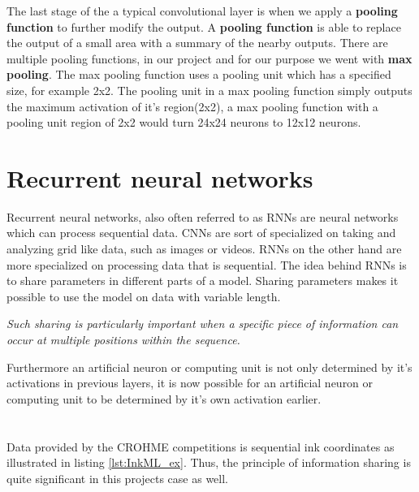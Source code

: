 The last stage of the a typical convolutional layer is when we apply a \textbf{pooling function}\parencite{zhou_computation_1988} to further modify the output. A \textbf{pooling function} is able to replace the output of a small area with a summary of the nearby outputs. There are multiple pooling functions, in our project and for our purpose we went with \textbf{max pooling}. The max pooling function uses a pooling unit which has a specified size, for example 2x2. The pooling unit in a max pooling function simply outputs the maximum activation of it's region(2x2), a max pooling function with a pooling unit region of 2x2 would turn 24x24 neurons to 12x12 neurons. \cite{goodfellow_deep_2016} \cite{nielsen_neural_2015}

\section{Recurrent neural networks}
Recurrent neural networks, also often referred to as RNNs \parencite{rumelhart_learning_1986} are neural networks which can process sequential data. CNNs are sort of specialized on taking and analyzing grid like data, such as images or videos. RNNs on the other hand are more specialized on processing data that is sequential. The idea behind RNNs is to share parameters in different parts of a model. Sharing parameters makes it possible to use the model on data with variable length. \begin{displayquote}
 \textit{Such sharing is particularly important when a specific piece of information can occur at multiple positions within the sequence.}
\end{displayquote}
Furthermore an artificial neuron or computing unit is not only determined by it's activations in previous layers, it is now possible for an artificial neuron or computing unit to be determined by it's own activation earlier. \\ \parencite{goodfellow_deep_2016} \parencite{nielsen_neural_2015} \\\\
Data provided by the CROHME competitions is sequential ink coordinates as illustrated in listing \ref{lst:InkML_ex}. Thus, the principle of information sharing is quite significant in this projects case as well. %

